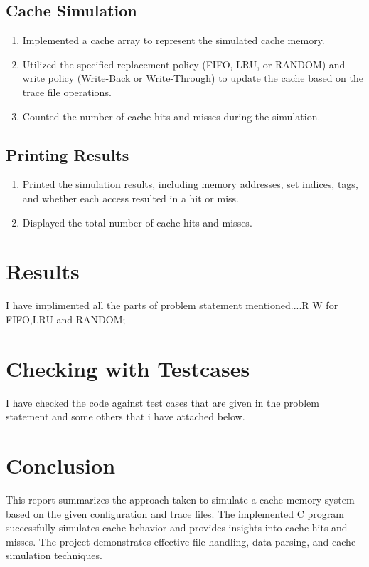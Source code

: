\documentclass{article}
\begin{document}
\subsection{Cache Simulation}
\begin{enumerate}
    \item Implemented a cache array to represent the simulated cache memory.
    \item Utilized the specified replacement policy (FIFO, LRU, or RANDOM) and write policy (Write-Back or Write-Through) to update the cache based on the trace file operations.
    \item Counted the number of cache hits and misses during the simulation.
\end{enumerate}

\subsection{Printing Results}
\begin{enumerate}
    \item Printed the simulation results, including memory addresses, set indices, tags, and whether each access resulted in a hit or miss.
    \item Displayed the total number of cache hits and misses.
\end{enumerate}

\section{Results}
I have implimented all the parts of problem statement mentioned....R W for FIFO,LRU and RANDOM;
\section{Checking with Testcases}
I have checked the code against test cases that are given in the problem statement and some others that i have attached below.
\section{Conclusion}
This report summarizes the approach taken to simulate a cache memory system based on the given configuration and trace files. The implemented C program successfully simulates cache behavior and provides insights into cache hits and misses. The project demonstrates effective file handling, data parsing, and cache simulation techniques.
\end{document}
